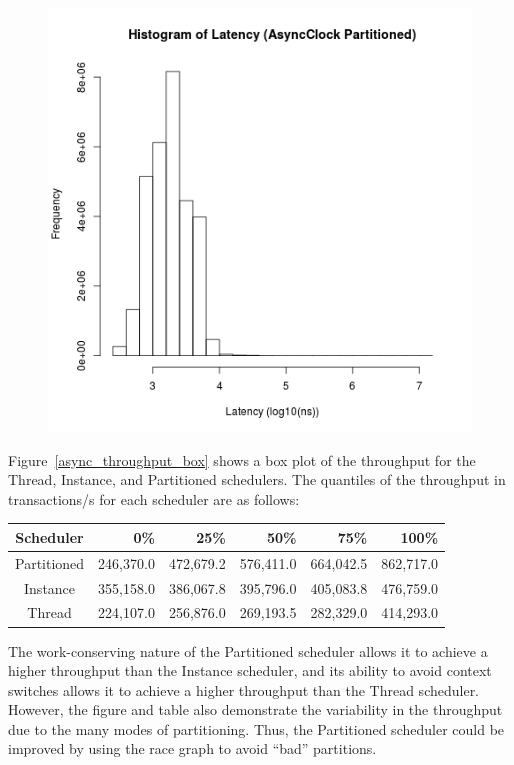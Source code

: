 \begin{figure}
\center
\includegraphics[height=.4\textheight]{async_partitioned_latency_hist.png}
\caption{\label{async_partitioned_latency}}
\end{figure}

Figure~\ref{async_throughput_box} shows a box plot of the throughput for the Thread, Instance, and Partitioned schedulers.
The quantiles of the throughput in transactions/s for each scheduler are as follows:
\begin{center}
\begin{tabular}{crrrrr}
Scheduler   &       0\%   &    25\%     &    50\%     &    75\%     &   100\% \\
\hline
Partitioned &   246,370.0 &   472,679.2 &   576,411.0 &   664,042.5 &    862,717.0 \\
Instance    &   355,158.0 &   386,067.8 &   395,796.0 &   405,083.8 &    476,759.0 \\
Thread      &   224,107.0 &   256,876.0 &   269,193.5 &   282,329.0 &    414,293.0 \\
\end{tabular}
\end{center}
The work-conserving nature of the Partitioned scheduler allows it to achieve a higher throughput than the Instance scheduler, and its ability to avoid context switches allows it to achieve a higher throughput than the Thread scheduler.
However, the figure and table also demonstrate the variability in the throughput due to the many modes of partitioning.
Thus, the Partitioned scheduler could be improved by using the race graph to avoid ``bad'' partitions.

